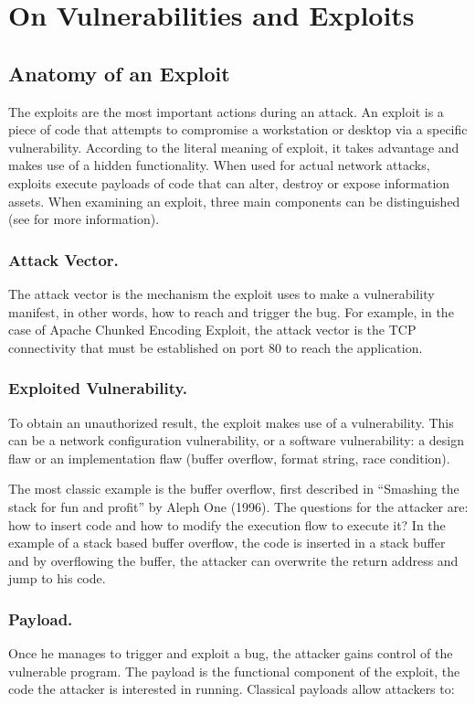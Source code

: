 \documentclass{llncs}
\begin{document}
\section{On Vulnerabilities and Exploits}
\label{exploits}


\subsection{Anatomy of an Exploit}

The exploits are the most important actions during an attack.
An exploit is a piece of code that attempts to compromise a workstation or desktop via a specific vulnerability.
According to the literal meaning of exploit, it takes advantage and makes use of a hidden functionality.
When used for actual network attacks, exploits execute payloads of code that can alter, 
destroy or expose information assets. 
When examining an exploit, three main components can be distinguished
(see \cite{payloads} for more information).

\subsubsection{Attack Vector.}
The attack vector is the mechanism the exploit uses to make a vulnerability manifest,
in other words, how to reach and trigger the bug.
For example, in the case of Apache Chunked Encoding Exploit, the attack vector is the 
TCP connectivity that must be established on port 80 to reach the application.
 
\subsubsection{Exploited Vulnerability.}
To obtain an unauthorized result, the exploit makes use of a vulnerability. 
This can be a network configuration vulnerability,
or a software vulnerability: a design flaw or an implementation flaw 
(buffer overflow, format string, race condition).

The most classic example is the buffer overflow, first described in 
``Smashing the stack for fun and profit''  by Aleph One (1996).
The questions for the attacker are: how to insert code and how to modify the execution flow
to execute it?
In the example of a stack based buffer overflow, the code is inserted in a stack buffer
and by overflowing the buffer, the attacker can overwrite the return address and jump to his code.

\subsubsection{Payload.}
Once he manages to trigger and exploit a bug,
the attacker gains control of the vulnerable program.
The payload is the functional component of the exploit, the code the attacker is interested in running.
Classical payloads allow attackers to:
\end{document}
